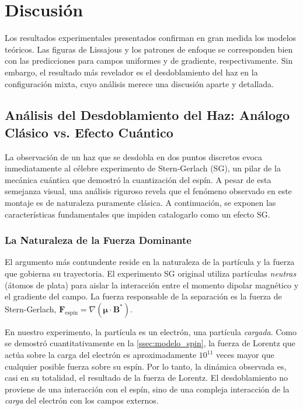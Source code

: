\chapter{Discusión}
\label{sec:discusion}

Los resultados experimentales presentados confirman en gran medida los
modelos teóricos. Las figuras de Lissajous y los patrones de enfoque se
corresponden bien con las predicciones para campos uniformes y de
gradiente, respectivamente. Sin embargo, el resultado más revelador es el
desdoblamiento del haz en la configuración mixta, cuyo análisis merece una
discusión aparte y detallada.

\section{Análisis del Desdoblamiento del Haz: Análogo Clásico vs. Efecto Cuántico}
\label{ssec:analisis_desdoblamiento}

La observación de un haz que se desdobla en dos puntos discretos evoca
inmediatamente al célebre experimento de Stern-Gerlach (SG), un pilar de
la mecánica cuántica que demostró la cuantización del espín. A pesar de
esta semejanza visual, una análisis riguroso revela que el fenómeno
observado en este montaje es de naturaleza puramente clásica. A
continuación, se exponen las características fundamentales que impiden
catalogarlo como un efecto SG.

\subsection{La Naturaleza de la Fuerza Dominante}

El argumento más contundente reside en la naturaleza de la partícula y la
fuerza que gobierna su trayectoria. El experimento SG original utiliza
partículas \emph{neutras} (átomos de plata) para aislar la interacción
entre el momento dipolar magnético y el gradiente del campo. La fuerza
responsable de la separación es la fuerza de Stern-Gerlach,
$\boldsymbol{F}_{\text{espín}} = \nabla (\boldsymbol{\mu} \cdot \boldsymbol{B}^*)$.

En nuestro experimento, la partícula es un electrón, una partícula
\emph{cargada}. Como se demostró cuantitativamente en la
\cref{ssec:modelo_spin}, la fuerza de Lorentz que actúa sobre la carga
del electrón es aproximadamente $10^{11}$ veces mayor que cualquier
posible fuerza sobre su espín. Por lo tanto, la dinámica observada es,
casi en su totalidad, el resultado de la fuerza de Lorentz. El desdoblamiento
no proviene de una interacción con el espín, sino de una compleja
interacción de la \emph{carga} del electrón con los campos externos.

